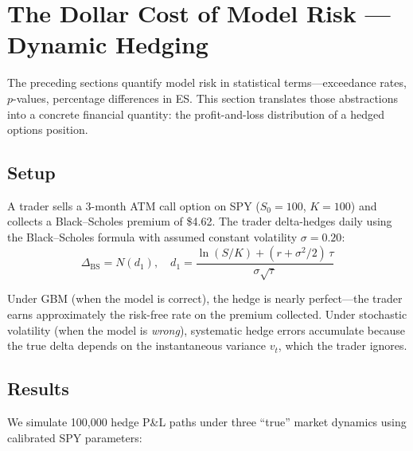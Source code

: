 \documentclass[11pt,a4paper]{article}
\begin{document}
\section{The Dollar Cost of Model Risk --- Dynamic Hedging}

The preceding sections quantify model risk in statistical terms---exceedance rates, $p$-values, percentage differences in ES. This section translates those abstractions into a concrete financial quantity: the profit-and-loss distribution of a hedged options position.

\subsection{Setup}

A trader sells a 3-month ATM call option on SPY ($S_0 = 100$, $K = 100$) and collects a Black--Scholes premium of \$4.62. The trader delta-hedges daily using the Black--Scholes formula with assumed constant volatility $\sigma = 0.20$:
\begin{equation}
\Delta_{\text{BS}} = N(d_1), \quad d_1 = \frac{\ln(S/K) + (r + \sigma^2/2)\,\tau}{\sigma\sqrt{\tau}}
\end{equation}

Under GBM (when the model is correct), the hedge is nearly perfect---the trader earns approximately the risk-free rate on the premium collected. Under stochastic volatility (when the model is \textit{wrong}), systematic hedge errors accumulate because the true delta depends on the instantaneous variance $v_t$, which the trader ignores.

\subsection{Results}

We simulate 100{,}000 hedge P\&L paths under three ``true'' market dynamics using calibrated SPY parameters:
\end{document}
